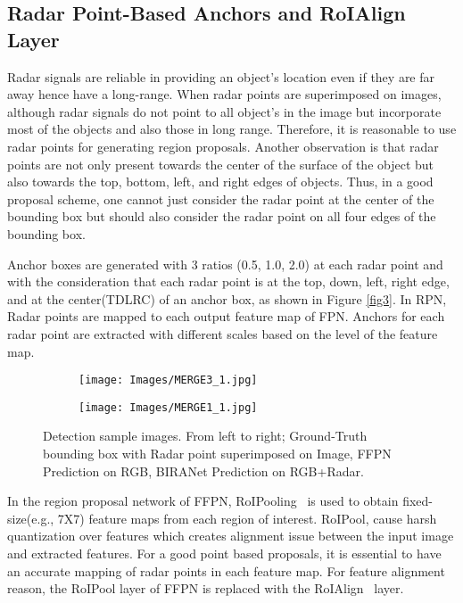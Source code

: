 \documentclass{article}
\begin{document}
\subsection{Radar Point-Based Anchors and RoIAlign Layer}
Radar signals are reliable in providing an object's location even if they are far away hence have a long-range. When radar points are superimposed on images, although radar signals do not point to all object's in the image but incorporate most of the objects and also those in long range. Therefore, it is reasonable to use radar points for generating region proposals.
Another observation is that radar points are not only present towards the center of the surface of the object but also towards the top, bottom, left, and right edges of objects. Thus, in a good proposal scheme, one cannot just consider the radar point at the center of the bounding box but should also consider the radar point on all four edges of the bounding box.

Anchor boxes are generated with 3 ratios (0.5, 1.0, 2.0) at each radar point and with the consideration that each radar point is at the top, down, left, right edge, and at the center(TDLRC) of an anchor box, as shown in Figure \ref{fig3}. In RPN, Radar points are mapped to each output feature map of FPN. Anchors for each radar point are extracted with different scales based on the level of the feature map.

\begin{figure*}  
\centering  
\begin{subfigure}
  \centering  
  \texttt{[image: Images/MERGE3\_1.jpg]}
\end{subfigure}
\begin{subfigure}
  \centering  
  \texttt{[image: Images/MERGE1\_1.jpg]}
\end{subfigure}
\caption{Detection sample images. From left to right; Ground-Truth bounding box with Radar point superimposed on Image, FFPN Prediction on RGB, BIRANet Prediction on RGB+Radar.}
\label{fig4}
\end{figure*}

In the region proposal network of FFPN, RoIPooling~\cite{lin2017feature} is used to obtain fixed-size(e.g., 7X7) feature maps from each region of interest. RoIPool, cause harsh quantization over features which creates alignment issue between the input image and extracted features. For a good point based proposals, it is essential to have an accurate mapping of radar points in each feature map. For feature alignment reason, the RoIPool layer of FFPN is replaced with the RoIAlign~\cite{he2017mask} layer.
\end{document}
